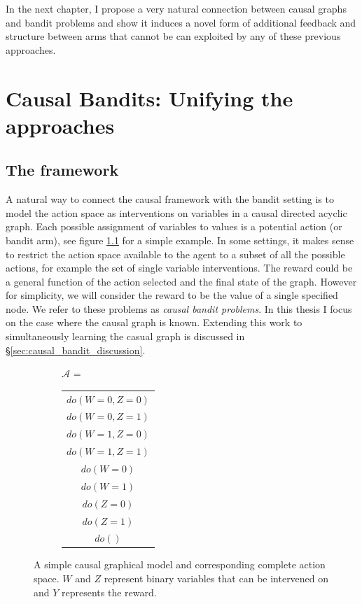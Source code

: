 \documentclass[11pt,a4paper,oneside]{book}
\newcommand{\actionspace}{\mathcal{A}}
\theoremstyle{plain}
\theoremstyle{definition}
\begin{document}
In the next chapter, I propose a very natural connection between causal graphs and bandit problems and show it induces a novel form of additional feedback and structure between arms that cannot be can exploited by any of these previous approaches. 


\chapter{Causal Bandits: Unifying the approaches}

\section{The framework}
\label{sec:intro_causal_bandit}
A natural way to connect the causal framework with the bandit setting is to model the action space as interventions on variables in a causal directed acyclic graph. Each possible assignment of variables to values is a potential action (or bandit arm), see figure \ref{fig:unify_frameworks} for a simple example. In some settings, it makes sense to restrict the action space available to the agent to a subset of all the possible actions, for example the set of single variable interventions. The reward could be a general function of the action selected and the final state of the graph. However for simplicity, we will consider the reward to be the value of a single specified node. We refer to these problems as \emph{causal bandit problems}. In this thesis I focus on the case where the causal graph is known. Extending this work to simultaneously learning the casual graph is discussed in \S\ref{sec:causal_bandit_discussion}.

\begin{figure}
\centering
\begin{subfigure}[c]{0.3\textwidth}
\end{subfigure}
\begin{subfigure}[t]{0.4\textwidth}
$\actionspace$ = \begin{tabular}{|c|}
	\hline
  $do(W=0,Z=0)$ \\
  $do(W=0,Z=1)$ \\
  $do(W=1,Z=0)$ \\
  $do(W=1,Z=1)$ \\
  \hline
  $do(W=0)$ \\
  $do(W=1)$ \\
  $do(Z=0)$ \\
  $do(Z=1)$ \\
  $do()$ \\
  \hline
\end{tabular}
\end{subfigure}
\caption{A simple causal graphical model and corresponding complete action space. $W$ and $Z$ represent binary variables that can be intervened on and $Y$ represents the reward.}
\label{fig:unify_frameworks}
\end{figure} 
\end{document}
